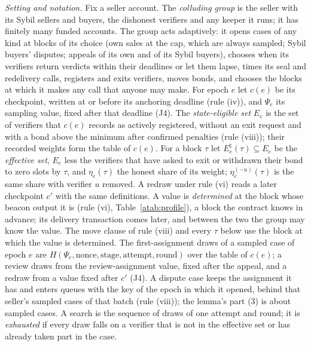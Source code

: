 \documentclass[10pt,a4paper]{article}
\theoremstyle{plain}
\theoremstyle{remark}
\begin{document}
\emph{Setting and notation.} Fix a seller account. The \emph{colluding group} is the seller with its Sybil sellers and buyers, the dishonest verifiers and any keeper it runs; it has finitely many funded accounts. The group acts adaptively: it opens cases of any kind at blocks of its choice (own sales at the cap, which are always sampled; Sybil buyers' disputes; appeals of its own and of its Sybil buyers), chooses when its verifiers return verdicts within their deadlines or let them lapse, times its seal and redelivery calls, registers and exits verifiers, moves bonds, and chooses the blocks at which it makes any call that anyone may make. For epoch $e$ let $c(e)$ be its checkpoint, written at or before its anchoring deadline (rule (iv)), and $\Psi_e$ its sampling value, fixed after that deadline (J4). The \emph{state-eligible set} $E_e$ is the set of verifiers that $c(e)$ records as actively registered, without an exit request and with a bond above the minimum after confirmed penalties (rule (viii)); their recorded weights form the table of $c(e)$. For a block $\tau$ let $E_e^\natural(\tau)\subseteq E_e$ be the \emph{effective set}, $E_e$ less the verifiers that have asked to exit or withdrawn their bond to zero slots by $\tau$, and $\eta_e(\tau)$ the honest share of its weight; $\eta_e^{(-u)}(\tau)$ is the same share with verifier $u$ removed. A redraw under rule (vi) reads a later checkpoint $c'$ with the same definitions. A value is \emph{determined} at the block whose beacon output it is (rule (vi), Table~\ref{atab:profile}), a block the contract knows in advance; its delivery transaction comes later, and between the two the group may know the value. The move clause of rule (viii) and every $\tau$ below use the block at which the value is determined. The first-assignment draws of a sampled case of epoch $e$ are $H(\Psi_e,\mathrm{nonce},\mathrm{stage},\mathrm{attempt},\mathrm{round})$ over the table of $c(e)$; a review draws from the review-assignment value, fixed after the appeal, and a redraw from a value fixed after $c'$ (J4). A dispute case keeps the assignment it has and enters queues with the key of the epoch in which it opened, behind that seller's sampled cases of that batch (rule (viii)); the lemma's part (3) is about sampled cases. A search is the sequence of draws of one attempt and round; it is \emph{exhausted} if every draw falls on a verifier that is not in the effective set or has already taken part in the case.
\end{document}
